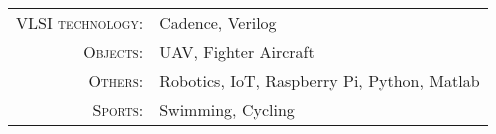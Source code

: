 %
%

\begin{tabular}{rl}
    \textsc{VLSI technology:} & Cadence, Verilog \\
   \textsc{Objects:} & UAV, Fighter Aircraft \\
   \textsc{Others:} & Robotics, IoT, Raspberry Pi, Python, Matlab \\
   \textsc{Sports:} & Swimming, Cycling \\
\end{tabular}